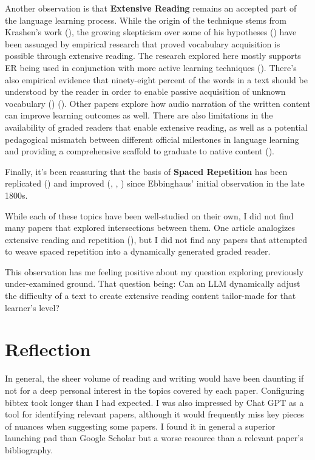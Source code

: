 \documentclass[
	letterpaper, %
]{jdf}
\begin{document}
Another observation is that \textbf{Extensive Reading} remains an accepted part of the language learning process. While the origin of the technique stems from Krashen's work (\cite{krashen_2004}), the growing skepticism over some of his hypotheses (\cite{krashenreview}) have been assuaged by empirical research that proved vocabulary acquisition is possible through extensive reading. The research explored here mostly supports ER being used in conjunction with more active learning techniques (\cite{mcdonald2016}). There's also empirical evidence that ninety-eight percent of the words in a text should be understood by the reader in order to enable passive acquisition of unknown vocabulary (\cite{hu_2000}) (\cite{nation1992vocabulary}). Other papers explore how audio narration of the written content can improve learning outcomes as well. There are also limitations in the availability of graded readers that enable extensive reading, as well as a potential pedagogical mismatch between different official milestones in language learning and providing a comprehensive scaffold to graduate to native content (\cite{Nation2020GradedRA}).

Finally, it's been reassuring that the basis of \textbf{Spaced Repetition} has been replicated (\cite{Murre2015ReplicationAA}) and improved (\cite{SuperMemo_Method_2023}, \cite{essay89410}, \cite{shortestpathrepetitionscheduling}) since Ebbinghaus' initial observation in the late 1800s. 

While each of these topics have been well-studied on their own, I did not find many papers that explored intersections between them. One article analogizes extensive reading and repetition (\cite{bullaughey2019reading}), but I did not find any papers that attempted to weave spaced repetition into a dynamically generated graded reader.

This observation has me feeling positive about my question exploring previously under-examined ground. That question being: Can an LLM dynamically adjust the difficulty of a text to create extensive reading content tailor-made for that learner's level?

\section{Reflection}
In general, the sheer volume of reading and writing would have been daunting if not for a deep personal interest in the topics covered by each paper. Configuring bibtex took longer than I had expected. I was also impressed by Chat GPT as a tool for identifying relevant papers, although it would frequently miss key pieces of nuances when suggesting some papers. I found it in general a superior launching pad than Google Scholar but a worse resource than a relevant paper's bibliography.
\end{document}
